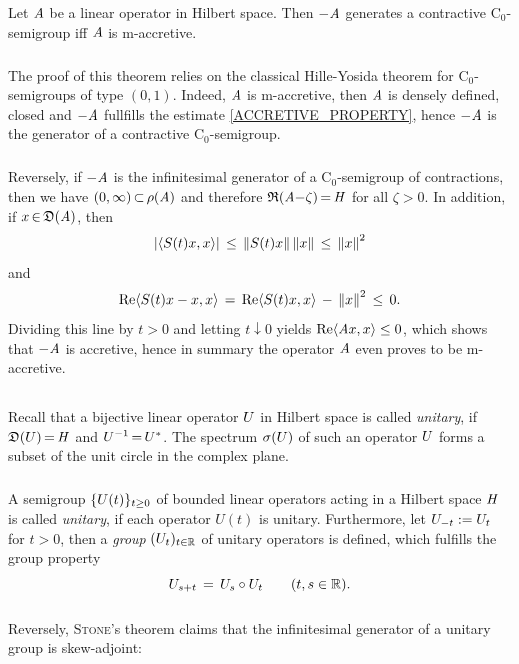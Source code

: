 \documentclass[11pt,twoside]{article}
\begin{document}
\begin{theorem}\label{LUMER-PHILLIPS_THEOREM}
Let $\mathit{A}$ be a linear operator in Hilbert space.
Then ${-}\mathit{A}$ generates a contractive C$_0$-semigroup
iff $\mathit{A}$ is m-accretive.
\end{theorem}

\subparagraph{}
The proof of this theorem relies on the classical Hille-Yosida theorem
for C$_0$-semigroups of type $(0,1)$.
Indeed, $\mathit{A}$ is m-accretive,
then $\mathit{A}$ is densely defined, closed
and $-\mathit{A}$ fullfills the estimate \eqref{ACCRETIVE_PROPERTY},
hence $-\mathit{A}$ is the generator of a contractive C$_0$-semigroup.

\subparagraph{}
Reversely,
if $-\mathit{A}$ is the infinitesimal generator of a C$_0$-semigroup of contractions,
then we have $(0,\infty) {\,\subset\,} \rho(\mathit{A})$
and therefore $\mathfrak{R}(\mathit{A} {-} \zeta) {\,=\,} \mathit{H}$ for all $\zeta > 0$.
In addition, if $x {\,\in\,} \mathfrak{D}(\mathit{A})$, then
\[
\abs{ \scalar{S(t) x}{x}} \,\leq\, \norm{S(t)x} \norm{x} \,\leq\, \norm{x}^2
\]
and
\[
\operatorname{Re} \langle S(t)x-x,x \rangle \,=\, \operatorname{Re} \langle S(t)x,x \rangle \,-\,\left\lVert x \right\rVert^2 \,\leq\, 0.
\]
Dividing this line by $t > 0$ and letting $t \downarrow 0$ yields
$\operatorname{Re} \langle \mathit{A} x,x \rangle \leq 0$,
which shows that $-\mathit{A}$ is accretive,
hence in summary the operator $\mathit{A}$ even proves to be m-accretive.

\subsection{} %
Recall that a bijective linear operator ${U}$ in Hilbert space
is called \textit{unitary},
if $\mathfrak{D}({U}) {\,=\,} \mathit{H}$ and ${U}^{-1} {\,=\,} {U}^*$.
The spectrum $\sigma({U})$ of such an operator ${U}$ forms a subset
of the unit circle in the complex plane.

\subparagraph{} %
A semigroup $\{{U}(t)\}_{t \geq 0}$ of bounded linear operators
acting in a Hilbert space $\mathit{H}$ is called \textit{unitary},
if each operator $U(t)$ is unitary.
Furthermore,
let ${U}_{-t} := {U}_t$ for $t > 0$,
then a \textit{group} $({U}_t)_{t \in {\mathbb{R}}}$ of unitary operators is defined,
which fulfills the group property
\[
{U}_{s+t} \,=\, {U}_s \circ {U}_t \quad \quad (t,s \in {\mathbb{R}}).
\]

\subparagraph{} %
Reversely,
\textsc{Stone}'s theorem claims
that the infinitesimal generator of a unitary group is skew-adjoint:
\end{document}
